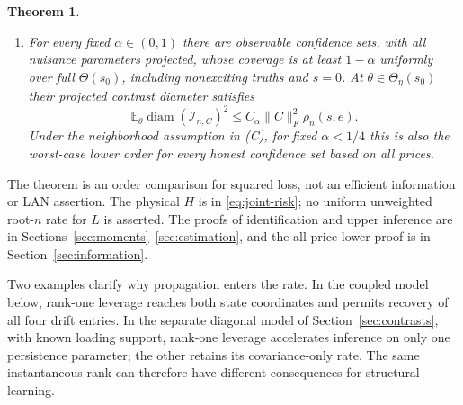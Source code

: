 \documentclass[11pt,a4paper]{amsart}
\theoremstyle{plain}
\newtheorem{theorem}{Theorem}[section]
\theoremstyle{definition}
\theoremstyle{remark}
\newcommand{\EE}{\mathbb{E}}
\DeclareMathOperator{\diam}{diam}
\begin{document}
\begin{theorem}
\begin{enumerate}[label=\textup{(\Alph*)},leftmargin=*]
subfamilies are not restrictions supplied to the estimator.
\item\label{part:confidence} For every fixed $\alpha\in(0,1)$ there are
observable confidence sets, with all nuisance parameters projected, whose coverage
is at least $1-\alpha$ uniformly over full $\Theta(s_0)$, including
nonexciting truths and $s=0$. At $\theta\in\Theta_\eta(s_0)$ their projected
contrast diameter satisfies
\begin{equation}\label{eq:diam-upper}
 \EE_\theta\diam(\mathcal I_{n,C})^2
 \le C_\alpha\|C\|_F^2\rho_n(s,e).
\end{equation}
Under the neighborhood assumption in \textup{(C)}, for fixed
$\alpha<1/4$ this is also the worst-case lower order for every honest
confidence set based on all prices.
\end{enumerate}
\end{theorem}

The theorem is an order comparison for squared loss, not an efficient
information or LAN assertion. The physical $H$ is in
\eqref{eq:joint-risk}; no uniform unweighted root-$n$ rate for $L$ is
asserted. The proofs of identification and upper inference are in
Sections~\ref{sec:moments}--\ref{sec:estimation}, and the all-price lower
proof is in Section~\ref{sec:information}.

Two examples clarify why propagation enters the rate. In the coupled
model below, rank-one leverage reaches both state coordinates and permits
recovery of all four drift entries. In the separate diagonal model of
Section~\ref{sec:contrasts}, with known loading support, rank-one leverage
accelerates inference on only one persistence parameter; the other retains
its covariance-only rate. The same instantaneous rank can therefore have
different consequences for structural learning.
\end{document}
